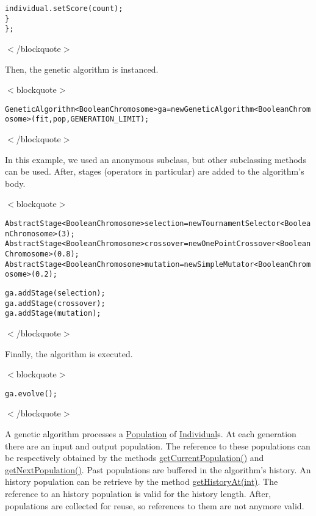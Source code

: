 \small\begin{alltt}             individual.setScore(count);
          \}           
     \};
 \end{alltt}
\normalsize 
 $<$/blockquote$>$

Then, the genetic algorithm is instanced. 

$<$blockquote$>$

\small\begin{alltt}
 GeneticAlgorithm<BooleanChromosome> ga = new GeneticAlgorithm<BooleanChromosome>(fit, pop, GENERATION\_LIMIT);
 \end{alltt}
\normalsize 


$<$/blockquote$>$ 

In this example, we used an anonymous subclass, but other subclassing methods can be used. After, stages (operators in particular) are added to the algorithm's body. 

$<$blockquote$>$

\small\begin{alltt}
 AbstractStage<BooleanChromosome> selection = new TournamentSelector<BooleanChromosome>(3);
 AbstractStage<BooleanChromosome> crossover = new OnePointCrossover<BooleanChromosome>(0.8);
 AbstractStage<BooleanChromosome> mutation = new SimpleMutator<BooleanChromosome>(0.2);\end{alltt}
\normalsize 


\small\begin{alltt} ga.addStage(selection);
 ga.addStage(crossover);
 ga.addStage(mutation);
 \end{alltt}
\normalsize 


$<$/blockquote$>$ 

Finally, the algorithm is executed. 

$<$blockquote$>$

\small\begin{alltt}
 ga.evolve();
 \end{alltt}
\normalsize 


$<$/blockquote$>$ 

A genetic algorithm processes a \hyperlink{}{Population} of \hyperlink{}{Individual}s. At each generation there are an input and output population. The reference to these populations can be respectively obtained by the methods \hyperlink{classjenes_1_1_genetic_algorithm_3_01_t_01extends_01_chromosome_01_4_855bc56ffb3e1704ced2fdf68cc96d8f}{getCurrentPopulation()} and \hyperlink{classjenes_1_1_genetic_algorithm_3_01_t_01extends_01_chromosome_01_4_5d22b21350638a64a66d3599b2777982}{getNextPopulation()}. Past populations are buffered in the algorithm's history. An history population can be retrieve by the method \hyperlink{classjenes_1_1_genetic_algorithm_3_01_t_01extends_01_chromosome_01_4_99718490498059da48833dfbdfc8076e}{getHistoryAt(int)}. The reference to an history population is valid for the history length. After, populations are collected for reuse, so references to them are not anymore valid. 

